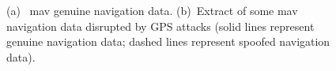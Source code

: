 \documentclass[letterpaper, 10pt, conference]{IEEEtran}
\begin{document}


\begin{figure}[!t]
\centering
{}
\caption{(a)~ \gls*{mav} genuine navigation data. (b)~Extract of some \gls*{mav}
  navigation data disrupted by GPS attacks (solid lines 
  represent genuine navigation data; dashed lines represent spoofed navigation data).\label{fig:fig2}}
\end{figure}
\end{document}
